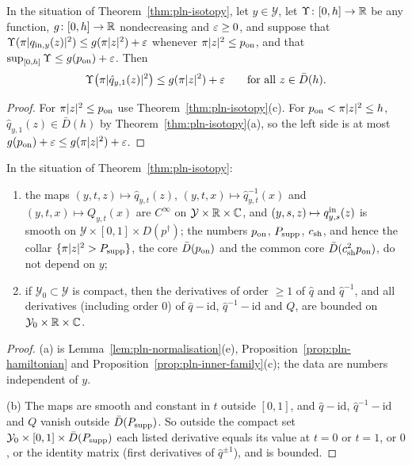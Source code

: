 \begin{corollary}\label{thm:pln-full-disc}
In the situation of Theorem~\ref{thm:pln-isotopy}, let $y\in\mathcal Y$, let $\Upsilon\colon[0,h]\to\mathbb{R}$ be any function,
$g\colon[0,h]\to\mathbb{R}$ nondecreasing and $\varepsilon\ge0$, and suppose that $\Upsilon(\pi|q_{{\rm in},y}(z)|^2)\le g(\pi|z|^2)+\varepsilon$ whenever
$\pi|z|^2\le p_{\rm on}$, and that $\sup_{[0,h]}\Upsilon\le g(p_{\rm on})+\varepsilon$. Then
\[
 \Upsilon\bigl(\pi|\hat q_{y,1}(z)|^2\bigr)\le g(\pi|z|^2)+\varepsilon\qquad\text{for all }z\in\bar D(h).
\]
\end{corollary}

\begin{proof}
For $\pi|z|^2\le p_{\rm on}$ use Theorem~\ref{thm:pln-isotopy}(c). For $p_{\rm on}<\pi|z|^2\le h$, $\hat q_{y,1}(z)\in\bar D(h)$ by Theorem~\ref{thm:pln-isotopy}(a), so the left side is at most $g(p_{\rm on})+\varepsilon\le g(\pi|z|^2)+\varepsilon$.
\end{proof}

\begin{theorem}\label{thm:pln-param}
In the situation of Theorem~\ref{thm:pln-isotopy}:
\begin{enumerate}[label=(\alph*)]
\item the maps $(y,t,z)\mapsto\hat q_{y,t}(z)$, $(y,t,x)\mapsto\hat q_{y,t}^{-1}(x)$ and $(y,t,x)\mapsto Q_{y,t}(x)$ are $C^\infty$ on
 $\mathcal Y\times\mathbb{R}\times\mathbb{C}$, and $(y,s,z)\mapsto q^{\rm in}_{y,s}(z)$ is smooth on $\mathcal Y\times[0,1]\times D(p^\dagger)$; the
 numbers $p_{\rm on}$, $P_{\rm supp}$, $c_{\rm sh}$, and hence the collar $\{\pi|z|^2>P_{\rm supp}\}$, the core $\bar D(p_{\rm on})$ and the
 common core $\bar D(c_{\rm sh}^2p_{\rm on})$, do not depend on $y$;
\item if $\mathcal Y_0\subset\mathcal Y$ is compact, then the derivatives of order $\ge1$ of $\hat q$ and $\hat q^{-1}$, and all
 derivatives (including order $0$) of $\hat q-\mathrm{id}$, $\hat q^{-1}-\mathrm{id}$ and $Q$, are bounded on
 $\mathcal Y_0\times\mathbb{R}\times\mathbb{C}$.
\end{enumerate}
\end{theorem}

\begin{proof}
(a) is Lemma~\ref{lem:pln-normalisation}(e), Proposition~\ref{prop:pln-hamiltonian} and Proposition~\ref{prop:pln-inner-family}(c); the data are numbers independent of $y$.

(b) The maps are smooth and constant in $t$ outside $[0,1]$, and $\hat q-\mathrm{id}$, $\hat q^{-1}-\mathrm{id}$ and $Q$ vanish outside $\bar D(P_{\rm supp})$. So outside the compact set $\mathcal Y_0\times[0,1]\times\bar D(P_{\rm supp})$ each listed derivative equals its value at $t=0$ or $t=1$, or $0$, or the identity matrix (first derivatives of $\hat q^{\pm1}$), and is bounded.
\end{proof}

